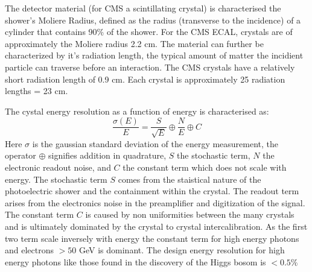 The detector material (for CMS a scintillating crystal) is characterised the shower's
 Moliere Radius, defined as the radius
 (transverse to the incidence) of a cylinder that contains 90\% of the shower. For the CMS ECAL, 
crystals are of approximately the Moliere radius 2.2 cm. The material can further
be characterized by it's radiation length, the typical amount of matter the incidient particle
can traverse before an interaction. The CMS crystals have a relatively short radiation
 length of 0.9 cm. Each crystal is approximately 25 radiation lengths = 23 cm. 

The cystal energy resolution as a function of energy is characterised as:
\begin{equation}
\frac{\sigma(E)}{E} = \frac{S}{\sqrt{E}} \oplus \frac{N}{E} \oplus C
\end{equation}
Here $\sigma$ is the gaussian standard deviation of the energy measurement, the operator $\oplus$ signifies addition in quadrature, $S$ the stochastic term, $N$ the
electronic readout noise, and $C$ the constant term which does not scale with energy. The 
stochastic term $S$ comes from the staistical nature of the photoelectric shower and the 
containment within the crystal. The readout term arises from the electronics noise in the preamplifier and digitization of the signal. The constant term $C$ is caused by non uniformities between
the many crystals and is ultimately dominated by the crystal to crystal intercalibration. As
the first two term scale inversely with energy the constant term for high energy photons and electrons $> 50$ GeV is dominant. The design energy resolution for high energy photons like those
found in the discovery of the Higgs bosom is $< 0.5\%$

